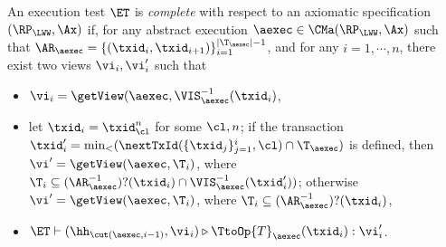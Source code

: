 \begin{definition}
\label{def:et_complete}
An execution test $\ET$ is \emph{complete} with respect 
to an axiomatic specification $(\RP_{\LWW}, \Ax)$ if, for any 
abstract execution $\aexec \in \CMa(\RP_{\LWW}, \Ax)$ 
such that $\AR_{\aexec} = \{(\txid_{i}, \txid_{i+1})\}_{i=1}^{\lvert \T_{\aexec} \rvert - 1}$, 
and for any $i=1,\cdots, n$, there exist two views $\vi_{i}, \vi_{i}'$ such that 
\begin{itemize}
\item $\vi_{i} = \getView(\aexec, \VIS_{\aexec}^{-1}(\txid_{i})$, 
\item let $\txid_{i} = \txid_{\cl}^{n}$ for some $\cl, n$; if the
transaction $\txid_{i}' = \min_{<}(\nextTxId(\{\txid_{j}\}_{j=1}^{i}, \cl) \cap \T_{\aexec})$ 
is defined, then $\vi' = \getView(\aexec, \T_{i})$, where $\T_{i} \subseteq (\AR_{\aexec}^{-1})?(\txid_{i}) \cap \VIS_{\aexec}^{-1}(\txid_{i}'))$; 
otherwise $\vi' = \getView(\aexec, \T_{i})$, where $\T_{i} \subseteq (\AR_{\aexec}^{-1})?(\txid_{i})$, 
\item $\ET \vdash (\hh_{\cut(\aexec, i-1)}, \vi_{i}) \triangleright \TtoOp{T}_{\aexec}(\txid_{i}) : \vi_{i}'$.
\end{itemize}
\end{definition}

%
%
